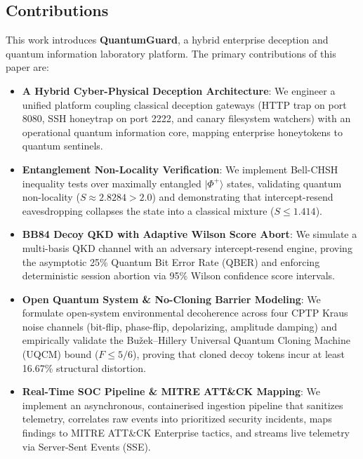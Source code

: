 \documentclass[journal,10pt]{IEEEtran}
\begin{document}
\subsection{Contributions}
This work introduces \textbf{QuantumGuard}, a hybrid enterprise deception and quantum information laboratory platform. The primary contributions of this paper are:
\begin{itemize}
    \item \textbf{A Hybrid Cyber-Physical Deception Architecture}: We engineer a unified platform coupling classical deception gateways (HTTP trap on port 8080, SSH honeytrap on port 2222, and canary filesystem watchers) with an operational quantum information core, mapping enterprise honeytokens to quantum sentinels.
    \item \textbf{Entanglement Non-Locality Verification}: We implement Bell-CHSH inequality tests over maximally entangled $|\Phi^+\rangle$ states, validating quantum non-locality ($S \approx 2.8284 > 2.0$) and demonstrating that intercept-resend eavesdropping collapses the state into a classical mixture ($S \le 1.414$).
    \item \textbf{BB84 Decoy QKD with Adaptive Wilson Score Abort}: We simulate a multi-basis QKD channel with an adversary intercept-resend engine, proving the asymptotic 25\% Quantum Bit Error Rate (QBER) and enforcing deterministic session abortion via 95\% Wilson confidence score intervals.
    \item \textbf{Open Quantum System \& No-Cloning Barrier Modeling}: We formulate open-system environmental decoherence across four CPTP Kraus noise channels (bit-flip, phase-flip, depolarizing, amplitude damping) and empirically validate the Bu\v{z}ek--Hillery Universal Quantum Cloning Machine (UQCM) bound ($F \le 5/6$), proving that cloned decoy tokens incur at least 16.67\% structural distortion.
    \item \textbf{Real-Time SOC Pipeline \& MITRE ATT\&CK Mapping}: We implement an asynchronous, containerised ingestion pipeline that sanitizes telemetry, correlates raw events into prioritized security incidents, maps findings to MITRE ATT\&CK Enterprise tactics, and streams live telemetry via Server-Sent Events (SSE).
\end{itemize}
\end{document}
